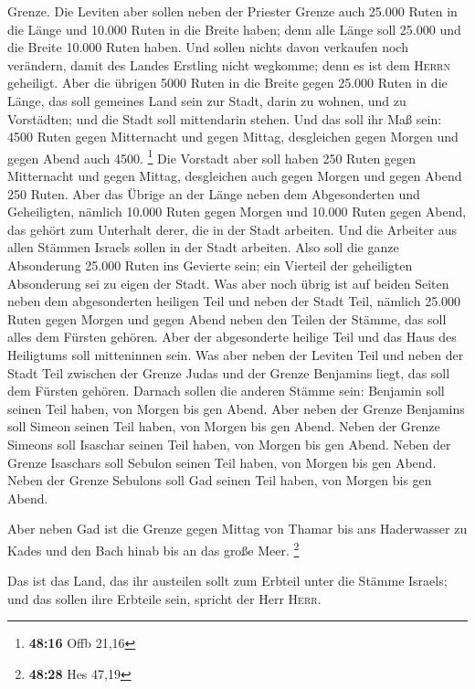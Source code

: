 Grenze.  Die Leviten aber sollen neben der Priester
Grenze auch 25.000 Ruten in die Länge und 10.000 Ruten in die Breite
haben; denn alle Länge soll 25.000 und die Breite 10.000 Ruten haben.
 Und sollen nichts davon verkaufen noch verändern, damit
des Landes Erstling nicht wegkomme; denn es ist dem \textsc{Herrn}
geheiligt.  Aber die übrigen 5000 Ruten in die Breite
gegen 25.000 Ruten in die Länge, das soll gemeines Land sein zur Stadt,
darin zu wohnen, und zu Vorstädten; und die Stadt soll mittendarin
stehen.  Und das soll ihr Maß sein: 4500 Ruten gegen
Mitternacht und gegen Mittag, desgleichen gegen Morgen und gegen Abend
auch 4500. \footnote{\textbf{48:16} Offb 21,16}  Die
Vorstadt aber soll haben 250 Ruten gegen Mitternacht und gegen Mittag,
desgleichen auch gegen Morgen und gegen Abend 250 Ruten. 
Aber das Übrige an der Länge neben dem Abgesonderten und Geheiligten,
nämlich 10.000 Ruten gegen Morgen und 10.000 Ruten gegen Abend, das
gehört zum Unterhalt derer, die in der Stadt arbeiten. 
Und die Arbeiter aus allen Stämmen Israels sollen in der Stadt arbeiten.
 Also soll die ganze Absonderung 25.000 Ruten ins
Gevierte sein; ein Vierteil der geheiligten Absonderung sei zu eigen der
Stadt.  Was aber noch übrig ist auf beiden Seiten neben
dem abgesonderten heiligen Teil und neben der Stadt Teil, nämlich 25.000
Ruten gegen Morgen und gegen Abend neben den Teilen der Stämme, das soll
alles dem Fürsten gehören. Aber der abgesonderte heilige Teil und das
Haus des Heiligtums soll mitteninnen sein.  Was aber
neben der Leviten Teil und neben der Stadt Teil zwischen der Grenze
Judas und der Grenze Benjamins liegt, das soll dem Fürsten gehören.
 Darnach sollen die anderen Stämme sein: Benjamin soll
seinen Teil haben, von Morgen bis gen Abend.  Aber neben
der Grenze Benjamins soll Simeon seinen Teil haben, von Morgen bis gen
Abend.  Neben der Grenze Simeons soll Isaschar seinen
Teil haben, von Morgen bis gen Abend.  Neben der Grenze
Isaschars soll Sebulon seinen Teil haben, von Morgen bis gen Abend.
 Neben der Grenze Sebulons soll Gad seinen Teil haben,
von Morgen bis gen Abend.

 Aber neben Gad ist die Grenze gegen Mittag von Thamar
bis ans Haderwasser zu Kades und den Bach hinab bis an das große Meer.
\footnote{\textbf{48:28} Hes 47,19}

 Das ist das Land, das ihr austeilen sollt zum Erbteil
unter die Stämme Israels; und das sollen ihre Erbteile sein, spricht der
Herr \textsc{Herr}.


